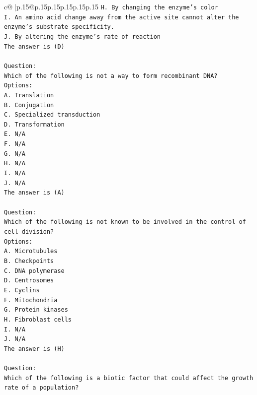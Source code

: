 \documentclass{article}
\begin{document}
{\begin{supertabular}{c@{$\;$}|p{.15\linewidth}@{}p{.15\linewidth}p{.15\linewidth}p{.15\linewidth}p{.15\linewidth}p{.15\linewidth}}
{{{\texttt{H. By changing the enzyme's color} \\
\texttt{I. An amino acid change away from the active site cannot alter the enzyme’s substrate specificity.} \\
\texttt{J. By altering the enzyme's rate of reaction} \\
\texttt{The answer is (D)} \\
\\ 
\texttt{Question:} \\
\texttt{Which of the following is not a way to form recombinant DNA?} \\
\texttt{Options:} \\
\texttt{A. Translation} \\
\texttt{B. Conjugation} \\
\texttt{C. Specialized transduction} \\
\texttt{D. Transformation} \\
\texttt{E. N/A} \\
\texttt{F. N/A} \\
\texttt{G. N/A} \\
\texttt{H. N/A} \\
\texttt{I. N/A} \\
\texttt{J. N/A} \\
\texttt{The answer is (A)} \\
\\ 
\texttt{Question:} \\
\texttt{Which of the following is not known to be involved in the control of cell division?} \\
\texttt{Options:} \\
\texttt{A. Microtubules} \\
\texttt{B. Checkpoints} \\
\texttt{C. DNA polymerase} \\
\texttt{D. Centrosomes} \\
\texttt{E. Cyclins} \\
\texttt{F. Mitochondria} \\
\texttt{G. Protein kinases} \\
\texttt{H. Fibroblast cells} \\
\texttt{I. N/A} \\
\texttt{J. N/A} \\
\texttt{The answer is (H)} \\
\\ 
\texttt{Question:} \\
\texttt{Which of the following is a biotic factor that could affect the growth rate of a population?} \\
}}}
\end{supertabular}}
\end{document}
